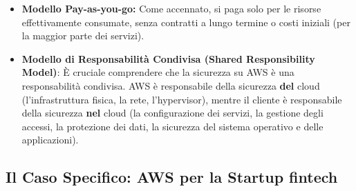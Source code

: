 \begin{itemize}
\begin{itemize}
        \end{itemize}
    \item \textbf{Modello Pay-as-you-go:} Come accennato, si paga solo per le risorse effettivamente consumate, senza contratti a lungo termine o costi iniziali (per la maggior parte dei servizi).
    \item \textbf{Modello di Responsabilità Condivisa (Shared Responsibility Model)}: È cruciale comprendere che la sicurezza su AWS è una responsabilità condivisa. AWS è responsabile della sicurezza \textbf{del} cloud (l'infrastruttura fisica, la rete, l'hypervisor), mentre il cliente è responsabile della sicurezza \textbf{nel} cloud (la configurazione dei servizi, la gestione degli accessi, la protezione dei dati, la sicurezza del sistema operativo e delle applicazioni).
\end{itemize}

\subsection{Il Caso Specifico: AWS per la Startup fintech}
\label{sec:aws-for-fintech}

